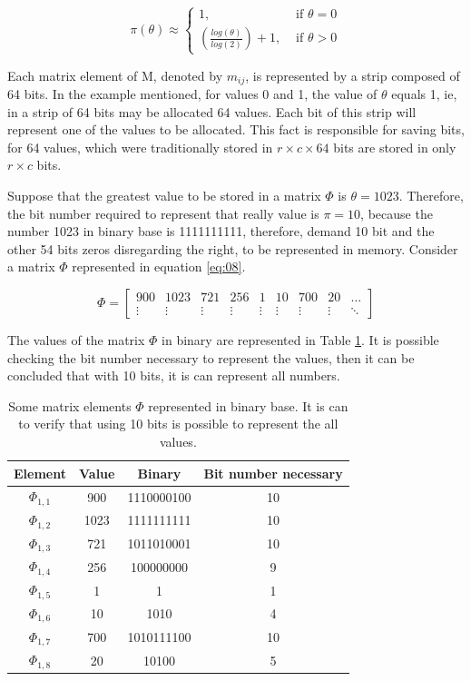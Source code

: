 \documentclass[10pt]{article}
\begin{document}
\begin{equation} \label{eq:07}
 \pi(\theta) \approx \begin{cases}
	1, &  \text{ if } \theta = 0 \\ 
	\left( \frac{log(\theta)}{log(2)}  \right) + 1,  & \text{ if } \theta > 0  
	\end{cases}
\end{equation}

Each matrix element of M, denoted by $m_{ij}$, is represented by a strip composed of 64 bits. In the example mentioned, for values ​​0 and 1, the value of $\theta$ equals 1, ie, in a strip of 64 bits may be allocated 64 values. Each bit of this strip will represent one of the values ​​to be allocated. This fact is responsible for saving bits, for 64 values​​, which were traditionally stored in $r \times c \times 64$  bits are stored in only $r \times c$ bits.

Suppose that the greatest value to be stored in a matrix $\Phi$ is $\theta=1023$. Therefore, the bit number required to represent that really value is $\pi=10$, because the number 1023 in binary base is 1111111111, therefore, demand 10 bit and the other 54 bits zeros disregarding the right, to be represented in memory. Consider a matrix $\Phi$ represented in equation \ref{eq:08}.

\begin{equation} \label{eq:08}
  \Phi = \begin{bmatrix}
  900 & 1023 & 721 & 256 & 1 & 10 & 700 & 20 & \hdots\\ 
  \vdots & \vdots & \vdots & \vdots & \vdots & \vdots & \vdots & \vdots & \ddots 
  \end{bmatrix}
\end{equation}

The values ​​of the matrix $\Phi$ in binary are represented in Table \ref{tab:01}. It is possible
checking the bit number necessary to represent the values​​, then it can be concluded
that with 10 bits, it is can represent all numbers.

\begin{table}[h]
 \centering
 \caption{Some matrix elements $\Phi$ represented in binary base. It is can to verify that using 10 bits is possible to represent the all values.}
 \begin{tabular}{cccc} 
  \hline 
  Element & Value  & Binary & Bit number necessary\\
  \hline
  $\Phi_{1,1}$ & 900  & 1110000100 & 10\\
  $\Phi_{1,2}$ & 1023 & 1111111111 & 10\\
  $\Phi_{1,3}$ & 721  & 1011010001 & 10\\
  $\Phi_{1,4}$ & 256  & 100000000  & 9\\
  $\Phi_{1,5}$ & 1    & 1          & 1\\
  $\Phi_{1,6}$ & 10   & 1010       & 4\\
  $\Phi_{1,7}$ & 700  & 1010111100 & 10\\
  $\Phi_{1,8}$ & 20   & 10100      & 5\\
  \hline
 \end{tabular}
 \label{tab:01}
\end{table}
\end{document}
